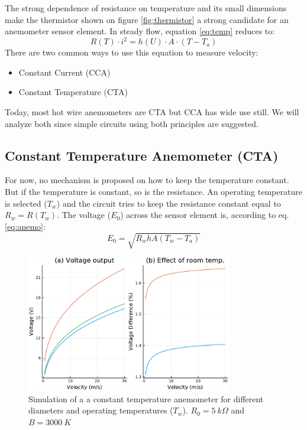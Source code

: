\documentclass[10pt,fleqn,a4paper,twoside]{article}
\begin{document}
The strong dependence of resistance on temperature and its small dimensions make the thermistor shown on figure \ref{fig:thermistor} a strong candidate for an anemometer sensor element. In steady flow, equation \ref{eq:temp} reduces to:
\begin{equation}
  R(T)\cdot i^2 = h(U)\cdot A \cdot \left(T - T_a\right)
  \label{eq:anemo}
\end{equation}
There are two common ways to use this equation to measure velocity:
\begin{itemize}
\item Constant Current (CCA)
\item Constant Temperature (CTA)
\end{itemize}
Today, most hot wire anemometers are CTA but CCA has wide use still. We will analyze both since simple circuits using both principles are suggested.

\subsection{Constant Temperature Anemometer (CTA)}
For now, no mechanism is proposed on how to keep the temperature constant. But if the temperature is constant, so is the resistance. An operating temperature is selected ($T_w$) and the circuit tries to keep the resistance constant equal to $R_w = R(T_w)$. The voltage ($E_0$)  across the sensor element is, according to eq. \ref{eq:anemo}:
\begin{equation}
  E_0 = \sqrt{R_w h A \left(T_w - T_a\right) }
  \label{eq:cta}
\end{equation}

\begin{figure}[h!]
\centering
\includegraphics[width=0.8\textwidth]{../../figures/CTA.pdf}
\caption{Simulation of a  a constant temperature anemometer for different diameters and operating temperatures ($T_w$). $R_0 = 5\:k\Omega$ and $B = 3000\:K$}
\label{fig:cta1}
\end{figure}
\end{document}
